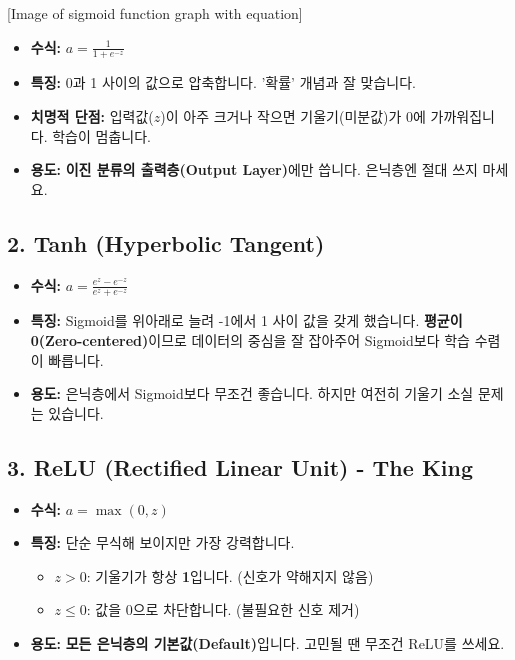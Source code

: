 \documentclass[11pt,a4paper]{book}
\theoremstyle{definition}
\begin{document}
[Image of sigmoid function graph with equation]

\begin{itemize}
    \item \textbf{수식:} $a = \frac{1}{1 + e^{-z}}$
    \item \textbf{특징:} 0과 1 사이의 값으로 압축합니다. '확률' 개념과 잘 맞습니다.
    \item \textbf{치명적 단점:} 입력값($z$)이 아주 크거나 작으면 기울기(미분값)가 0에 가까워집니다. 학습이 멈춥니다.
    \item \textbf{용도:} \textbf{이진 분류의 출력층(Output Layer)}에만 씁니다. 은닉층엔 절대 쓰지 마세요.
\end{itemize}

\subsection{2. Tanh (Hyperbolic Tangent)}

\begin{itemize}
    \item \textbf{수식:} $a = \frac{e^z - e^{-z}}{e^z + e^{-z}}$
    \item \textbf{특징:} Sigmoid를 위아래로 늘려 -1에서 1 사이 값을 갖게 했습니다. \textbf{평균이 0(Zero-centered)}이므로 데이터의 중심을 잘 잡아주어 Sigmoid보다 학습 수렴이 빠릅니다.
    \item \textbf{용도:} 은닉층에서 Sigmoid보다 무조건 좋습니다. 하지만 여전히 기울기 소실 문제는 있습니다.
\end{itemize}

\subsection{3. ReLU (Rectified Linear Unit) - The King}

\begin{itemize}
    \item \textbf{수식:} $a = \max(0, z)$
    \item \textbf{특징:} 단순 무식해 보이지만 가장 강력합니다.
    \begin{itemize}
        \item $z > 0$: 기울기가 항상 \textbf{1}입니다. (신호가 약해지지 않음)
        \item $z \le 0$: 값을 0으로 차단합니다. (불필요한 신호 제거)
    \end{itemize}
    \item \textbf{용도:} \textbf{모든 은닉층의 기본값(Default)}입니다. 고민될 땐 무조건 ReLU를 쓰세요.
\end{itemize}
\end{document}
